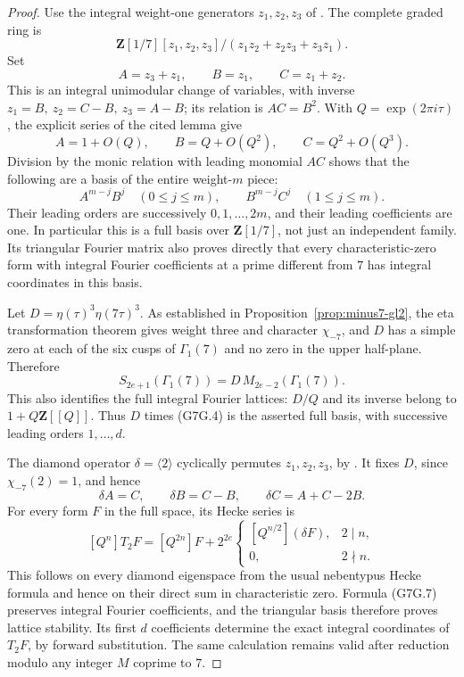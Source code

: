\begin{proof}
Use the integral weight-one generators \(z_1,z_2,z_3\) of
\cite[Lemma~2.3 and Proposition~2.4, pp.~9--11]{K17MeierOzornova2020}.
The complete graded ring is
\[
 \mathbf Z[1/7][z_1,z_2,z_3]/
       (z_1z_2+z_2z_3+z_3z_1).
 \tag{G7G.2}
\]
Set
\[
 A=z_3+z_1,\qquad B=z_1,\qquad C=z_1+z_2.
\]
This is an integral unimodular change of variables, with inverse
\(z_1=B,\ z_2=C-B,\ z_3=A-B\); its relation is \(AC=B^2\).
With \(Q=\exp(2\pi i\tau)\), the explicit series of the cited lemma give
\[
 A=1+O(Q),\qquad B=Q+O(Q^2),\qquad C=Q^2+O(Q^3).
 \tag{G7G.3}
\]
Division by the monic relation with leading monomial \(AC\)
shows that the following are a basis of the entire weight-\(m\)
piece:
\[
 A^{m-j}B^j\quad(0\le j\le m),\qquad
 B^{m-j}C^j\quad(1\le j\le m).
 \tag{G7G.4}
\]
Their leading orders are successively \(0,1,\ldots,2m\), and
their leading coefficients are one. In particular this is a
full basis over \(\mathbf Z[1/7]\), not just an independent family.
Its triangular Fourier matrix also proves directly that every
characteristic-zero form with integral Fourier coefficients at a
prime different from \(7\) has integral coordinates in this basis.

Let \(D=\eta(\tau)^3\eta(7\tau)^3\).
As established in Proposition~\ref{prop:minus7-gl2}, the eta
transformation theorem
\cite[Theorem~1.1, Remark~1.2 and Proposition~3.1]{K17SavittNewman}
gives weight three and character \(\chi_{-7}\), and \(D\) has
a simple zero at each of the six cusps of \(\Gamma_1(7)\)
and no zero in the upper half-plane. Therefore
\[
 S_{2e+1}(\Gamma_1(7))=D\,M_{2e-2}(\Gamma_1(7)).
 \tag{G7G.5}
\]
This also identifies the full integral Fourier lattices:
\(D/Q\) and its inverse belong to \(1+Q\mathbf Z[[Q]]\).
Thus \(D\) times (G7G.4) is the asserted full basis, with
successive leading orders \(1,\ldots,d\).

The diamond operator \(\delta=\langle2\rangle\) cyclically
permutes \(z_1,z_2,z_3\), by
\cite[Lemma~2.6, p.~11]{K17MeierOzornova2020}.
It fixes \(D\), since \(\chi_{-7}(2)=1\), and hence
\[
 \delta A=C,\qquad
 \delta B=C-B,\qquad
 \delta C=A+C-2B.
 \tag{G7G.6}
\]
For every form \(F\) in the full space, its Hecke series is
\[
 [Q^n]T_2F=[Q^{2n}]F+
  2^{2e}\begin{cases}[Q^{n/2}](\delta F),&2\mid n,\\0,&2\nmid n.\end{cases}
 \tag{G7G.7}
\]
This follows on every diamond eigenspace from the usual
nebentypus Hecke formula and hence on their direct sum in
characteristic zero. Formula (G7G.7) preserves integral Fourier
coefficients, and the triangular basis therefore proves lattice
stability. Its first \(d\) coefficients determine the exact
integral coordinates of \(T_2F\), by forward substitution.
The same calculation remains valid after reduction modulo any
integer \(M\) coprime to \(7\).


\end{proof}
